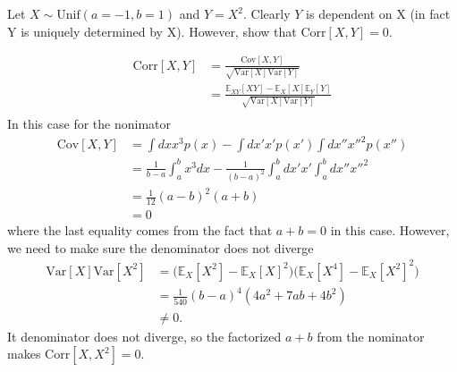 \begin{example}
	Let $X\sim \text{Unif}(a=-1, b=1)$ and $Y=X^2$. Clearly $Y$ is dependent on X (in fact Y is uniquely determined by X). However, show that $\text{Corr}[X,Y]=0$.
	
	\begin{equation}
		\begin{split}
			\text{Corr}[X,Y] & = \frac{\text{Cov}[X,Y]}{\sqrt{\text{Var}[X]\text{Var}[Y]}}\\
			& = \frac{\mathbb{E}_{XY}[XY]-\mathbb{E}_X[X]\mathbb{E}_Y[Y]}{\sqrt{\text{Var}[X]\text{Var}[Y]}}\\
		\end{split}
	\end{equation}
	In this case for the nonimator
	\begin{equation}
		\begin{split}
			\text{Cov}[X,Y] &= \int dx x^3 p(x)-\int dx' x'p(x')\int dx'' x''^2p(x'')\\
			&= \frac{1}{b-a}\int_{a}^{b}x^3dx-\frac{1}{(b-a)^2}\int_{a}^{b}dx' x'\int_{a}^{b}dx'' x''^2\\
			&= \frac{1}{12}(a-b)^2(a+b)\\
			&=0
		\end{split}
	\end{equation}
	where the last equality comes from the fact that $a+b = 0$ in this case. However, we need to make sure the denominator does not diverge
	\begin{equation}
		\begin{split}
			\text{Var}[X]\text{Var}[X^2] & =\big(\mathbb{E}_X[X^2]-\mathbb{E}_X[X]^2\big) \big(\mathbb{E}_X[X^4]-\mathbb{E}_X[X^2]^2\big)\\
			& = \frac{1}{540}(b-a)^4(4a^2+7ab+4b^2)\\
			&\neq 0.
		\end{split}
	\end{equation}
	It denominator does not diverge, so the factorized $a+b$ from the nominator makes $\text{Corr}[X,X^2]=0$.
\end{example}

